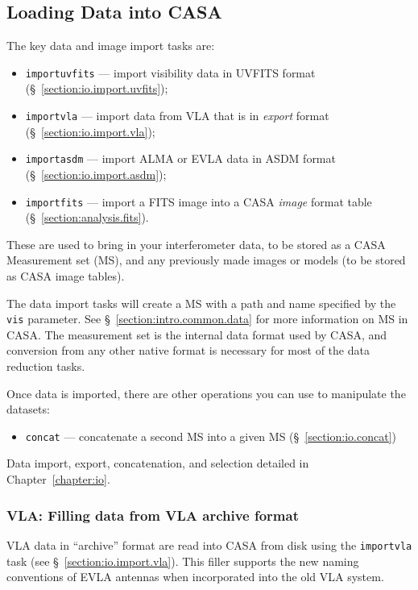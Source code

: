 \subsection{Loading Data into CASA}
\label{section:intro.walkthru.load}

The key data and image import tasks are:
\begin{itemize}
   \item {\tt importuvfits} --- import visibility data in UVFITS
         format (\S~\ref{section:io.import.uvfits});
   \item {\tt importvla} --- import data from VLA that is in 
         {\it export} format (\S~\ref{section:io.import.vla});
   \item {\tt importasdm} --- import ALMA or EVLA data in ASDM format 
         (\S~\ref{section:io.import.asdm});
   \item {\tt importfits} --- import a FITS image into a CASA  
         {\it image} format table (\S~\ref{section:analysis.fits}).
\end{itemize}

These are used to bring in your interferometer data, to be stored
as a CASA Measurement set (MS), and any previously made images
or models (to be stored as CASA image tables).  

The data import tasks will create a MS with a path and name specified
by the {\tt vis} parameter.  See \S~\ref{section:intro.common.data}
for more information on MS in CASA.  The measurement set is the 
internal data format used by CASA, and conversion from any other
native format is necessary for most of the data reduction tasks.

Once data is imported, there are other operations you can use to
manipulate the datasets:
\begin{itemize}
   \item {\tt concat} --- concatenate a second MS into a
         given MS (\S~\ref{section:io.concat})
\end{itemize}

Data import, export, concatenation, and selection
detailed in Chapter~\ref{chapter:io}.

\subsubsection{VLA: Filling data from VLA archive format}
\label{section:intro.walkthru.load.VLAfill}

VLA data in ``archive'' format are read into CASA from disk using
the {\tt importvla} task (see \S~\ref{section:io.import.vla}).  
This filler supports the new naming conventions of EVLA antennas
when incorporated into the old VLA system.

